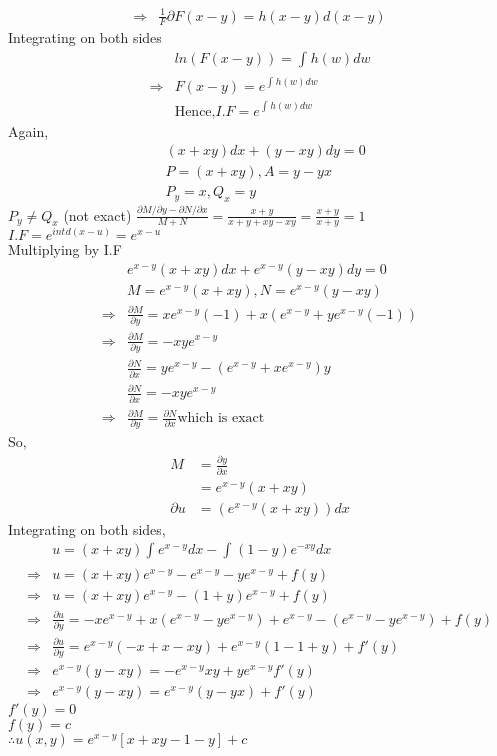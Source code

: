 \documentclass{report}
\begin{document}
{\begin{align*}
        \Rightarrow & \frac{1}{F} \partial F(x-y) = h(x-y)d(x-y)
    \end{align*}
    Integrating on both sides  
    \begin{align*}
        & ln(F(x-y)) = \int_{}^{}h(w)dw\\
        \Rightarrow & F(x-y) = e^{\int_{}^{}h(w)dw}\\
        & \text{Hence,} I.F = e^{\int_{}^{}h(w)dw}
    \end{align*}
    Again,
    \begin{align*}
        & (x+xy)dx+(y-xy)dy=0\\
        & P = (x+xy), A = y-yx\\
        & P_y = x, Q_x=y
    \end{align*}
    $P_y \neq Q_x$ (not exact)
    $\frac{ \partial M/\partial y -\partial N/\partial x  }{M+N} = \frac{ x+y}{x+y+xy-xy} = \frac{x+y}{x+y}=1$\\
    $I.F = e^{int_{}^{}d(x-u)} = e^{x-u}$\\
    Multiplying by I.F
    \begin{align*}
        & e^{x-y}(x+xy)dx+e^{x-y}(y-xy)dy =0\\
        & M = e^{x-y}(x+xy) ,N =e^{x-y}(y-xy)\\
        \Rightarrow & \frac{\partial M}{\partial y} = xe^{x-y}(-1)+x(e^{x-y}+ye^{x-y}(-1))\\
        \Rightarrow & \frac{\partial M}{\partial y} = -xye^{x-y}\\
        & \frac{\partial N}{\partial x} = ye^{x-y}-(e^{x-y}+xe^{x-y})y\\
        & \frac{\partial N}{\partial x} = -xye^{x-y}\\
        \Rightarrow & \frac{\partial M}{\partial y} = \frac{\partial N}{\partial x} \text{which is exact}
    \end{align*}
    So, 
    \begin{align*}
        M &= \frac{\partial y}{\partial x}\\
        & = e^{x-y}(x+xy)\\
        \partial u& = (e^{x-y}(x+xy))dx
    \end{align*}
    Integrating on both sides,
    \begin{align*}
        & u = (x+xy) \int_{}^{}e^{x-y}dx - \int_{}^{}(1-y)e^{-xy}dx\\
        \Rightarrow & u= (x+xy)e^{x-y} - e^{x-y}-ye^{x-y}+f(y)\\
        \Rightarrow & u= (x+xy)e^{x-y} -(1+y) e^{x-y}+f(y)\\
        \Rightarrow & \frac{\partial u}{\partial y} = -xe^{x-y} + x(e^{x-y}-ye^{x-y}) + e^{x-y}-(e^{x-y}-ye^{x-y})+f(y)\\
        \Rightarrow & \frac{\partial u}{\partial y} = e^{x-y}(-x+x-xy)+e^{x-y}(1-1+y) + f'(y)\\
        \Rightarrow & e^{x-y}(y-xy) = -e^{x-y}xy+ ye^{x-y}f'(y)\\
        \Rightarrow & e^{x-y}(y-xy) = e^{x-y}(y-yx)+ f'(y)
    \end{align*}
    $f'(y)=0$\\
    $f(y) =c$\\
    $\therefore u(x,y) = e^{x-y}[x+xy-1-y]+c$ 
}
\end{document}
